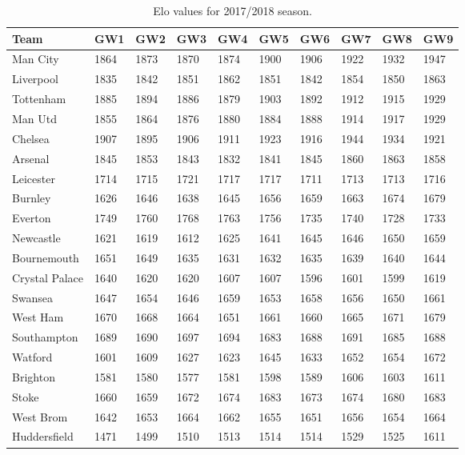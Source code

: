 \begin{table}[H]
\centering
\smaller
\begin{tabular}{|l|l|l|l|l|l|l|l|l|l|}
\hline
Team           & GW1  & GW2  & GW3  & GW4  & GW5  & GW6  & GW7  & GW8  & GW9   \\
\hline
Man City       & 1864 & 1873 & 1870 & 1874 & 1900 & 1906 & 1922 & 1932 & 1947  \\
Liverpool      & 1835 & 1842 & 1851 & 1862 & 1851 & 1842 & 1854 & 1850 & 1863  \\
Tottenham      & 1885 & 1894 & 1886 & 1879 & 1903 & 1892 & 1912 & 1915 & 1929  \\
Man Utd        & 1855 & 1864 & 1876 & 1880 & 1884 & 1888 & 1914 & 1917 & 1929  \\
Chelsea        & 1907 & 1895 & 1906 & 1911 & 1923 & 1916 & 1944 & 1934 & 1921  \\
Arsenal        & 1845 & 1853 & 1843 & 1832 & 1841 & 1845 & 1860 & 1863 & 1858  \\
Leicester      & 1714 & 1715 & 1721 & 1717 & 1717 & 1711 & 1713 & 1713 & 1716  \\
Burnley        & 1626 & 1646 & 1638 & 1645 & 1656 & 1659 & 1663 & 1674 & 1679  \\
Everton        & 1749 & 1760 & 1768 & 1763 & 1756 & 1735 & 1740 & 1728 & 1733  \\
Newcastle      & 1621 & 1619 & 1612 & 1625 & 1641 & 1645 & 1646 & 1650 & 1659  \\
Bournemouth    & 1651 & 1649 & 1635 & 1631 & 1632 & 1635 & 1639 & 1640 & 1644  \\
Crystal Palace & 1640 & 1620 & 1620 & 1607 & 1607 & 1596 & 1601 & 1599 & 1619  \\
Swansea        & 1647 & 1654 & 1646 & 1659 & 1653 & 1658 & 1656 & 1650 & 1661  \\
West Ham       & 1670 & 1668 & 1664 & 1651 & 1661 & 1660 & 1665 & 1671 & 1679  \\
Southampton    & 1689 & 1690 & 1697 & 1694 & 1683 & 1688 & 1691 & 1685 & 1688  \\
Watford        & 1601 & 1609 & 1627 & 1623 & 1645 & 1633 & 1652 & 1654 & 1672  \\
Brighton       & 1581 & 1580 & 1577 & 1581 & 1598 & 1589 & 1606 & 1603 & 1611  \\
Stoke          & 1660 & 1659 & 1672 & 1674 & 1683 & 1673 & 1674 & 1680 & 1683  \\
West Brom      & 1642 & 1653 & 1664 & 1662 & 1655 & 1651 & 1656 & 1654 & 1664  \\
Huddersfield   & 1471 & 1499 & 1510 & 1513 & 1514 & 1514 & 1529 & 1525 & 1611  \\
\hline
\end{tabular}
\caption{Elo values for 2017/2018 season.}
\label{tab:elo_values_gameweeks_1}
\end{table}


